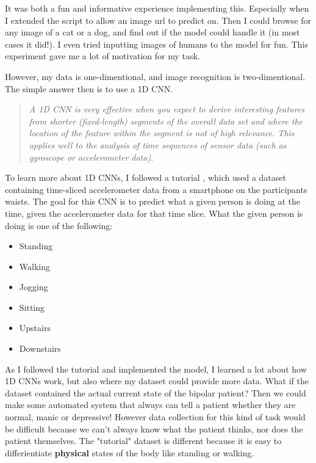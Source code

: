 It was both a fun and informative experience implementing this. Especially when I extended the script to allow an image url to predict on. 
Then I could browse for any image of a cat or a dog, and find out if the model could handle it (in most cases it did!). 
I even tried inputting images of humans to the model for fun. This experiment gave me a lot of motivation for my task.

\newpage

However, my data is one-dimentional, and image recognition is two-dimentional. The simple answer then is to use a 1D CNN.

\begin{quote}
  \textit{A 1D CNN is very effective when you expect to derive interesting features from shorter (fixed-length) segments of the overall data set 
  and where the location of the feature within the segment is not of high relevance. This applies well to the analysis of time sequences of sensor data 
  (such as gyroscope or accelerometer data).} \cite{1d_cnn}
\end{quote}

To learn more about 1D CNNs, I followed a tutorial \cite{1d_cnn}, which used a dataset containing 
time-sliced accelerometer data from a smartphone on the participants waists. The goal for this CNN is to predict what a given person is doing 
at the time, given the accelerometer data for that time slice. What the given person is doing is one of the following:
\begin{itemize}
  \item Standing
  \item Walking
  \item Jogging
  \item Sitting
  \item Upstairs
  \item Downstairs
\end{itemize}

As I followed the tutorial and implemented the model, I learned a lot about how 1D CNNs work, but also where my dataset could provide more data. 
What if the dataset contained the actual current state of the bipolar patient? Then we could make some automated system that always can tell a patient 
whether they are normal, manic or depressive! However data collection for this kind of task would be difficult because we can't always know what the
patient thinks, nor does the patient themselves. The "tutorial" dataset is different because it is easy to differientiate \textbf{physical} states of the body
like standing or walking.

